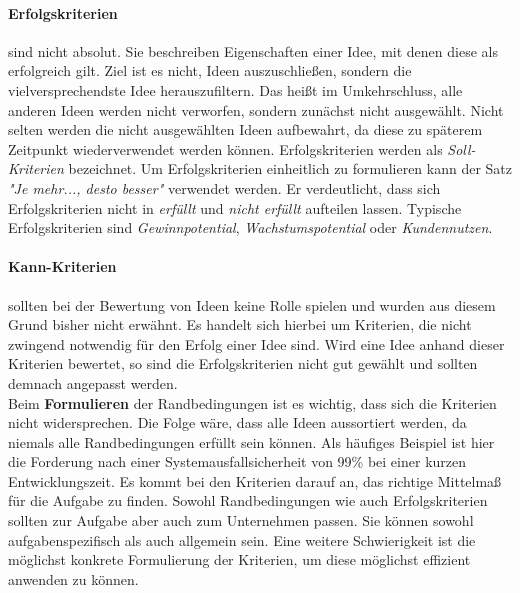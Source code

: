 \paragraph{Erfolgskriterien} sind nicht absolut. Sie beschreiben Eigenschaften einer Idee, 
mit denen diese als erfolgreich gilt. Ziel ist es nicht, Ideen auszuschließen, sondern die
vielversprechendste Idee herauszufiltern. Das heißt im Umkehrschluss, alle anderen Ideen werden nicht 
verworfen, sondern zunächst nicht ausgewählt. Nicht selten werden die nicht ausgewählten Ideen aufbewahrt, da diese zu späterem 
Zeitpunkt wiederverwendet werden können. Erfolgskriterien werden als \textit{Soll-Kriterien} bezeichnet. Um 
Erfolgskriterien einheitlich zu formulieren kann der Satz \textit{"Je mehr..., desto besser"} verwendet werden.
Er verdeutlicht, dass sich Erfolgskriterien nicht in \textit{erfüllt} und \textit{nicht erfüllt} aufteilen 
lassen. Typische Erfolgskriterien sind \textit{Gewinnpotential}, \textit{Wachstumspotential} oder \textit{Kundennutzen}.

\paragraph{Kann-Kriterien} sollten bei der Bewertung von Ideen keine Rolle spielen und wurden aus diesem Grund bisher nicht erwähnt.
Es handelt sich hierbei um Kriterien, die nicht zwingend notwendig für den Erfolg einer Idee sind. Wird eine Idee anhand 
dieser Kriterien bewertet, so sind die Erfolgskriterien nicht gut gewählt und sollten demnach angepasst werden.\\

Beim \textbf{Formulieren} der Randbedingungen ist es wichtig, dass sich die Kriterien nicht
widersprechen. Die Folge wäre, dass alle Ideen aussortiert werden, da niemals alle Randbedingungen erfüllt sein können.
Als häufiges Beispiel ist hier die Forderung nach einer Systemausfallsicherheit von 99\%  bei einer
kurzen Entwicklungszeit. 
Es kommt bei den Kriterien darauf an, das richtige Mittelmaß für die Aufgabe zu finden. 
Sowohl Randbedingungen wie auch Erfolgskriterien sollten zur Aufgabe aber auch zum Unternehmen passen. Sie können sowohl aufgabenspezifisch
als auch allgemein sein. Eine weitere Schwierigkeit ist die möglichst konkrete
Formulierung der Kriterien, um diese möglichst effizient anwenden zu können. \\

